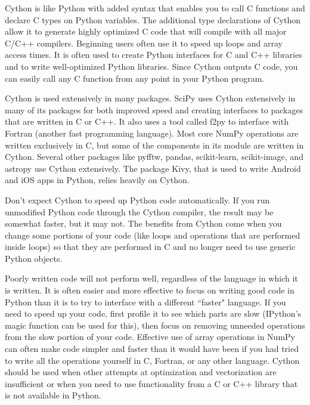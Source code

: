 Cython is like Python with added syntax that enables you to call C functions and declare C types on Python variables.
The additional type declarations of Cython allow it to generate highly optimized C code that will compile with all major C/C++ compilers.
Beginning users often use it to speed up loops and array access times.
It is often used to create Python interfaces for C and C++ libraries and to write well-optimized Python libraries.
Since Cython outputs C code, you can easily call any C function from any point in your Python program.

Cython is used extensively in many packages.
SciPy uses Cython extensively in many of its packages for both improved speed and creating interfaces to packages that are written in C or C++.
It also uses a tool called f2py to interface with Fortran (another fast programming language).
Most core NumPy operations are written exclusively in C, but some of the components in its  module are written in Cython.
Several other packages like pyfftw, pandas, scikit-learn, scikit-image, and astropy use Cython extensively.
The package Kivy, that is used to write Android and iOS apps in Python, relies heavily on Cython.

\begin{warn}
Don't expect Cython to speed up Python code automatically.
If you run unmodified Python code through the Cython compiler, the result may be somewhat faster, but it may not.
The benefits from Cython come when you change some portions of your code (like loops and operations that are performed inside loops) so that they are performed in C and no longer need to use generic Python objects.
\end{warn}

\begin{warn}
Poorly written code will not perform well, regardless of the language in which it is written.
It is often easier and more effective to focus on writing good code in Python than it is to try to interface with a different ``faster" language.
If you need to speed up your code, first profile it to see which parts are slow (IPython's magic function  can be used for this), then focus on removing unneeded operations from the slow portion of your code.
Effective use of array operations in NumPy can often make code simpler and faster than it would have been if you had tried to write all the operations yourself in C, Fortran, or any other language.
Cython should be used when other attempts at optimization and vectorization are insufficient or when you need to use functionality from a C or C++ library that is not available in Python.
\end{warn}

